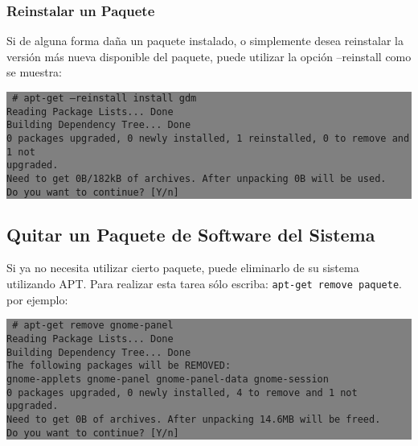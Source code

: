 \documentclass[12pt]{article}
\begin{document}
\subsubsection*{Reinstalar un Paquete}

Si de alguna forma daña un paquete instalado, o simplemente desea reinstalar la versión más nueva disponible del paquete, puede utilizar la opción --reinstall como se muestra:

\colorbox{grey}{\parbox[t]{0.95\linewidth}{ \vspace*{0.5cm} {\tt
     \# apt-get --reinstall install gdm\\
     Reading Package Lists... Done\\
     Building Dependency Tree... Done\\
     0 packages upgraded, 0 newly installed, 1 reinstalled, 0 to remove and 1 not\\
      upgraded.\\
     Need to get 0B/182kB of archives. After unpacking 0B will be used.\\
     Do you want to continue? [Y/n]\\
 } \vspace*{0.5cm} } } 



\subsection*{Quitar un Paquete de Software del Sistema}

Si ya no necesita utilizar cierto paquete, puede eliminarlo de su sistema utilizando APT. Para realizar esta tarea sólo escriba: \texttt{apt-get remove paquete}. por ejemplo:

\colorbox{grey}{\parbox[t]{0.95\linewidth}{ \vspace*{0.5cm} {\tt
     \# apt-get remove gnome-panel\\
     Reading Package Lists... Done\\
     Building Dependency Tree... Done\\
     The following packages will be REMOVED:\\
       gnome-applets gnome-panel gnome-panel-data gnome-session\\
     0 packages upgraded, 0 newly installed, 4 to remove and 1 not upgraded.\\
     Need to get 0B of archives. After unpacking 14.6MB will be freed.\\
     Do you want to continue? [Y/n]\\
 } \vspace*{0.5cm} } } 
\end{document}
